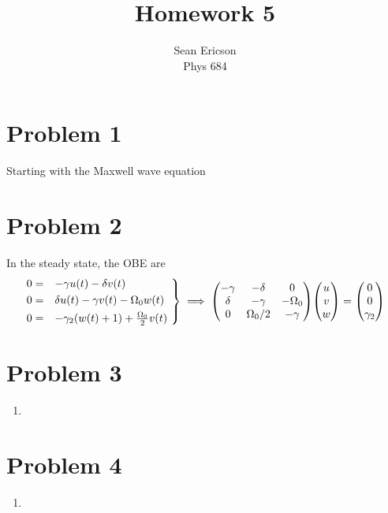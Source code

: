 \documentclass[12pt]{article}
\begin{document}
	
\title{Homework 5}
\author{Sean Ericson \\ Phys 684}
\maketitle

\section*{Problem 1}
Starting with the Maxwell wave equation

\section*{Problem 2}
In the steady state, the OBE are    
\[
\begin{rcases*}
0 =& $-\gamma u(t) - \delta v(t)$ \\
0 =& $\delta u(t) - \gamma v(t) - \Omega_0 w(t)$ \\
0 =& $-\gamma_2 (w(t) + 1) + \frac{\Omega_0}{2}v(t)$
\end{rcases*}
\implies
\mqty(-\gamma&-\delta&0\\\delta&-\gamma&-\Omega_0\\0&\Omega_0/2&-\gamma)\mqty(u\\v\\w) = \mqty(0\\0\\\gamma_2)
\]

\section*{Problem 3}
\begin{enumerate}[label=(\alph*)]
    \item 
\end{enumerate}

\section*{Problem 4}
\begin{enumerate}[label=(\alph*)]
    \item 
\end{enumerate}


\end{document}

